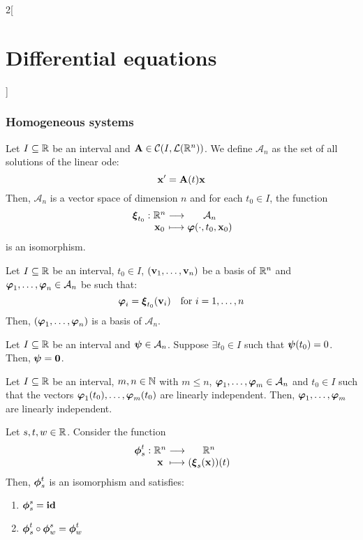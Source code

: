 \documentclass[../../../main.tex]{subfiles}
\begin{document}
\begin{multicols}{2}[\section{Differential equations}]
    \subsubsection{Homogeneous systems}
    \begin{theorem}
        Let $I\subseteq\mathbb{R}$ be an interval and $\boldsymbol{\mathrm{A}}\in\mathcal{C}(I,\mathcal{L}(\mathbb{R}^n))$. We define $\mathcal{A}_n$ as the set of all solutions of the linear ode:
        \begin{equation}\label{DE_homo}
            \boldsymbol{\mathrm{x}}'=\boldsymbol{\mathrm{A}}(t)\boldsymbol{\mathrm{x}}
        \end{equation} Then, $\mathcal{A}_n$ is a vector space of dimension $n$ and for each $t_0\in I$, the function
        $$
            \function{\vf{\xi}_{t_0}}{\RR^n}{\mathcal{A}_n}{\vf{x}_0}{\vf{\varphi}(\cdot,t_0,\vf{x}_0)}
        $$
        is an isomorphism.
    \end{theorem}
    \begin{corollary}
        Let $I\subseteq\mathbb{R}$ be an interval, $t_0\in I$, $(\boldsymbol{\mathrm{v}}_1,\ldots,\boldsymbol{\mathrm{v}}_n)$ be a basis of $\mathbb{R}^n$ and $\boldsymbol{\mathrm{\varphi}}_1,\ldots,\boldsymbol{\mathrm{\varphi}}_n\in\mathcal{A}_n$ be such that: $$\boldsymbol{\mathrm{\varphi}}_i=\boldsymbol{\mathrm{\xi}}_{t_0}(\boldsymbol{\mathrm{v}}_i)\quad\text{for } i=1,\ldots,n$$
        Then, $(\boldsymbol{\mathrm{\varphi}}_1,\ldots,\boldsymbol{\mathrm{\varphi}}_n)$ is a basis of $\mathcal{A}_n$.
    \end{corollary}
    \begin{corollary}
        Let $I\subseteq\mathbb{R}$ be an interval and $\boldsymbol{\mathrm{\psi}}\in\mathcal{A}_n$. Suppose $\exists t_0\in I$ such that $\boldsymbol{\mathrm{\psi}} (t_0)=0$. Then, $\boldsymbol{\mathrm{\psi}}=\boldsymbol{\mathrm{0}}$.
    \end{corollary}
    \begin{corollary}
        Let $I\subseteq\mathbb{R}$ be an interval, $m,n\in\mathbb{N}$ with $m\leq n$, $\boldsymbol{\mathrm{\varphi}}_1,\ldots,\boldsymbol{\mathrm{\varphi}}_m\in\mathcal{A}_n$ and $t_0\in I$ such that the vectors $\boldsymbol{\mathrm{\varphi}}_1(t_0),\ldots,\boldsymbol{\mathrm{\varphi}}_m(t_0)$ are linearly independent. Then, $\boldsymbol{\mathrm{\varphi}}_1,\ldots,\boldsymbol{\mathrm{\varphi}}_m$ are linearly independent.
    \end{corollary}
    \begin{corollary}
        Let $s,t,w\in\mathbb{R}$. Consider the function
        $$
            \function{\vf{\phi}_s^t}{\RR^n}{\RR^n}{\vf{x}}{(\vf{\xi}_s(\vf{x}))(t)}
        $$
        Then, $\boldsymbol{\mathrm{\phi}}_s^t$ is an isomorphism and satisfies:
        \begin{enumerate}
            \item $\boldsymbol{\mathrm{\phi}}_s^s=\boldsymbol{\mathrm{\mathrm{id}}}$
            \item $\boldsymbol{\mathrm{\phi}}_s^t\circ\boldsymbol{\mathrm{\phi}}_w^s=\boldsymbol{\mathrm{\phi}}_w^t$

\end{enumerate}
\end{corollary}
\end{multicols}
\end{document}
